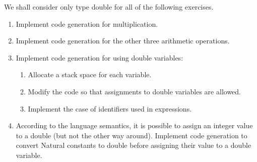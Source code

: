 We shall consider only type double for all of the following exercises.
\begin{enumerate}
\item Implement code generation for multiplication.
\item Implement code generation for the other three arithmetic operations.
\item Implement code generation for using double variables:
\begin{enumerate}
\item Allocate a stack space for each variable.
\item Modify the code so that assignments to double variables are allowed.
\item Implement the case of identifiers used in expressions.
\end{enumerate}
\item According to the language semantics, it is possible to assign an integer value to a double (but not the other way around). Implement code generation to convert Natural constants to double before assigning their value to a double variable.
\end{enumerate}

